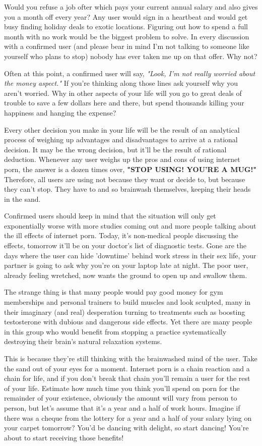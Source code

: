 \documentclass[easypeasy.tex]{subfiles}
\begin{document}
Would you refuse a job ofter which pays your current annual salary and also gives you a month off every year? Any user would sign in a heartbeat and would get busy finding holiday deals to exotic locations. Figuring out how to spend a full month with no work would be the biggest problem to solve. In every discussion with a confirmed user (and please bear in mind I'm not talking to someone like yourself who plans to stop) nobody has ever taken me up on that offer. Why not?

Often at this point, a confirmed user will say, \textit{"Look, I'm not really worried about the money aspect."} If you're thinking along those lines ask yourself why you aren't worried. Why in other aspects of your life will you go to great deals of trouble to save a few dollars here and there, but spend thousands killing your happiness and hanging the expense?

Every other decision you make in your life will be the result of an analytical process of weighing up advantages and disadvantages to arrive at a rational decision. It may be the wrong decision, but it'll be the result of rational deduction. Whenever any user weighs up the pros and cons of using internet porn, the answer is a dozen times over, \textbf{"STOP USING! YOU'RE A MUG!"} Therefore, all users are using not because they want or decide to, but because they can't stop. They have to and so brainwash themselves, keeping their heads in the sand.

Confirmed users should keep in mind that the situation will only get exponentially worse with more studies coming out and more people talking about the ill effects of internet porn. Today, it's non-medical people discussing the effects, tomorrow it'll be on your doctor's list of diagnostic tests. Gone are the days where the user can hide 'downtime' behind work stress in their sex life, your partner is going to ask why you're on your laptop late at night. The poor user, already feeling wretched, now wants the ground to open up and swallow them.

The strange thing is that many people would pay good money for gym memberships and personal trainers to build muscles and look sculpted, many in their imaginary (and real) desperation turning to treatments such as boosting testosterone with dubious and dangerous side effects. Yet there are many people in this group who would benefit from stopping a practice systematically destroying their brain's natural relaxation systems.

This is because they're still thinking with the brainwashed mind of the user. Take the sand out of your eyes for a moment. Internet porn is a chain reaction and a chain for life, and if you don't break that chain you'll remain a user for the rest of your life. Estimate how much time you think you'll spend on porn for the remainder of your existence, obviously the amount will vary from person to person, but let's assume that it's a year and a half of work hours. Imagine if there was a cheque from the lottery for a year and a half of your salary lying on your carpet tomorrow? You'd be dancing with delight, so start dancing! You're about to start receiving those benefits!
\end{document}

